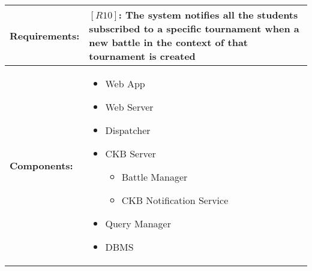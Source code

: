 \begin{table}[H]
  \centering
  \begin{tabularx}{\textwidth}{|p{3cm}|X|}
    \hline
    \textbf{Requirements:} &
    $[R10]$: The system notifies all the students subscribed to a specific tournament when a new battle in the context of that tournament is created 
    \\
    \hline
    \textbf{Components:} & 
    \begin{itemize}
        \item Web App
        \item Web Server 
        \item Dispatcher
        \item CKB Server 
        \begin{itemize}
            \item Battle Manager 
            \item CKB Notification Service
        \end{itemize}
        \item Query Manager 
        \item DBMS
    \end{itemize}
    \\
    \hline
  \end{tabularx}
\end{table}



